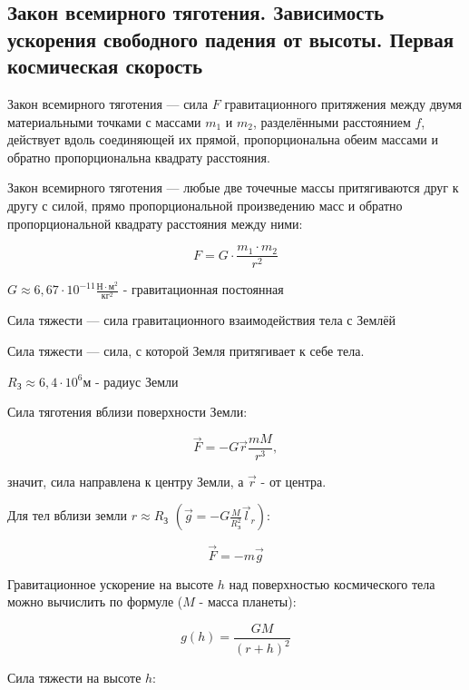 \subsection{Закон всемирного тяготения. Зависимость ускорения свободного падения от высоты. Первая космическая скорость}

\begin{definition}
    Закон всемирного тяготения — сила $F$ гравитационного притяжения между двумя материальными точками с массами $m_1$ и $m_2$, 
    разделёнными расстоянием $f$, 
    действует вдоль соединяющей их прямой, пропорциональна обеим массами и обратно пропорциональна квадрату расстояния.
\end{definition}

Закон всемирного тяготения — любые две точечные массы притягиваются друг к другу с силой, прямо пропорциональной произведению масс 
и обратно пропорциональной квадрату расстояния между ними:

$$F=G\cdot\frac{m_1\cdot m_2}{r^2}$$

$G\approx 6,67\cdot 10^{-11} \frac{Н \cdot м^2}{кг^2}$ - гравитационная постоянная

\begin{definition}
     Сила тяжести  — сила гравитационного взаимодействия тела с Землёй

     Сила тяжести  — сила, с которой Земля притягивает к себе тела.
\end{definition}

\begin{remark}
    $R_З\approx 6,4\cdot 10^6 м$ - радиус Земли
\end{remark}

\begin{remark}
    Сила тяготения вблизи поверхности Земли:

\end{remark}

$$\vec F=-G\vec r\frac{mM}{r^3},$$

значит, сила направлена к центру Земли, а $\vec r$ - от центра.

Для тел вблизи земли $r\approx R_З$ $\displaystyle(\vec g=-G\frac{M}{R^2_З}\vec l_r)$:

$$\vec F=-m\vec g$$

Гравитационное ускорение на высоте $h$ над поверхностью космического тела можно вычислить по формуле ($M$ - масса планеты):

$$g(h)=\frac{GM}{(r+h)^2}$$

Сила тяжести на высоте $h$:

